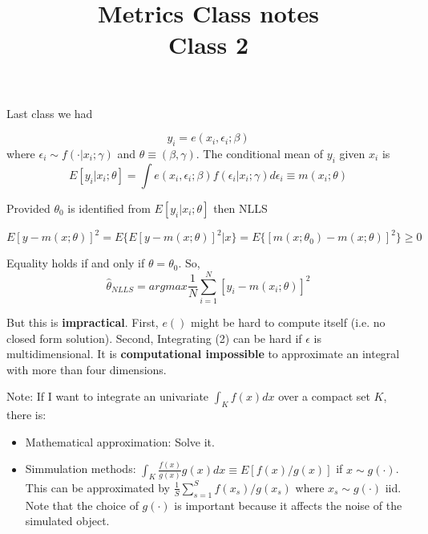 \documentclass[12pt]{article}
\title{\Large{\textbf{Metrics Class notes}} \\
Class 2}
\begin{document}
\maketitle

Last class we had

\begin{equation}
	y_i = e(x_i, \epsilon_i; \beta)
\end{equation}
	where $\epsilon_i \sim f(\cdot | x_i; \gamma )$ and $\theta \equiv (\beta, \gamma)$. The conditional mean of $y_i$ given $x_i$ is
	\begin{equation}
		E[y_i | x_i; \theta] = \int e(x_i, \epsilon_i; \beta) f(\epsilon_i | x_i; \gamma ) d \epsilon_i
		\equiv m(x_i; \theta)
	\end{equation}

	Provided $\theta_0$ is identified from $E[y_i | x_i; \theta]$ then NLLS

	\begin{equation}
		E[y - m(x;\theta)]^2 = E \{ E[y - m(x;\theta)]^2 | x \} = E \{ [m(x;\theta_0) - m(x; \theta)]^2 \} \geq 0
	\end{equation}

	Equality holds if and only if $\theta=\theta_0$. So,
	\begin{equation}
		\hat{\theta}_{NLLS} = argmax \frac{1}{N} \sum^N_{i=1} [y_i - m(x_i; \theta)]^2
	\end{equation}

	But this is \textbf{impractical}. First, $e()$ might be hard to compute itself (i.e. no closed form solution). Second, Integrating (2) can be hard if $\epsilon$ is multidimensional. It is \textbf{computational impossible} to approximate an integral with more than four dimensions.

	Note: If I want to integrate an univariate $\int_K f(x) dx$ over a compact set $K$, there is:
	\begin{itemize}
		\item Mathematical approximation: Solve it.
		\item Simmulation methods: $\int_K \frac{f(x)}{g(x)} g(x) dx \equiv E[f(x)/g(x)]$ if $x \sim g(\cdot)$. This can be approximated by $\frac{1}{S} \sum^S_{s=1} f(x_s)/g(x_s)$ where $x_s \sim g(\cdot)$ iid. Note that the choice of $g(\cdot)$ is important because it affects the noise of the simulated object.
	\end{itemize}
\end{document}
